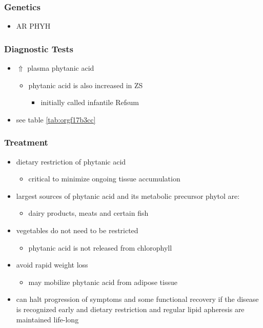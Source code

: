 \documentclass[12pt]{scrartcl}
\begin{document}
\subsubsection{Genetics}
\label{sec:org6de213a}
\begin{itemize}
\item AR PHYH
\end{itemize}

\subsubsection{Diagnostic Tests}
\label{sec:org5de9578}
\begin{itemize}
\item \(\Uparrow\) plasma phytanic acid 
\begin{itemize}
\item phytanic acid is also increased in ZS
\begin{itemize}
\item initially called infantile Refsum
\end{itemize}
\end{itemize}
\item see table \ref{tab:orgf17b3cc}
\end{itemize}
\subsubsection{Treatment}
\label{sec:org935a4c7}
\begin{itemize}
\item dietary restriction of phytanic acid 
\begin{itemize}
\item critical to minimize ongoing tissue accumulation
\end{itemize}
\item largest sources of phytanic acid and its metabolic precursor phytol are:
\begin{itemize}
\item dairy products, meats and certain fish
\end{itemize}
\item vegetables do not need to be restricted
\begin{itemize}
\item phytanic acid is not released from chlorophyll
\end{itemize}
\item avoid rapid weight loss
\begin{itemize}
\item may mobilize phytanic acid from adipose tissue
\end{itemize}
\item can halt progression of symptoms and some functional recovery if the
disease is recognized early and dietary restriction and regular
lipid apheresis are maintained life-long
\end{itemize}
\end{document}
